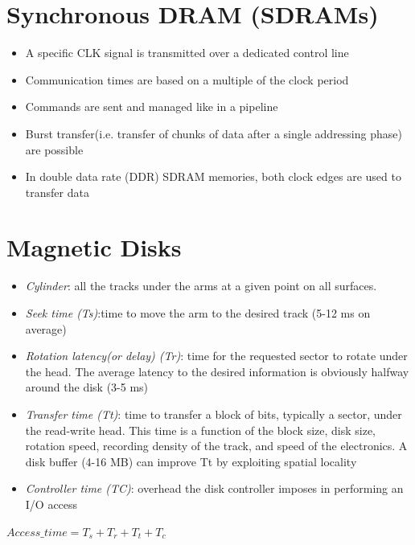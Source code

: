 \section{Synchronous DRAM (SDRAMs)}
\begin{itemize}
    \item A specific CLK signal is transmitted over a dedicated control line
    \item Communication times are based on a multiple of the clock period
    \item Commands are sent and managed like in a pipeline
    \item Burst transfer(i.e. transfer of chunks of data after a single addressing phase) are possible
    \item In double data rate (DDR) SDRAM memories, both clock edges are used to transfer data
\end{itemize}

\section{Magnetic Disks}
\begin{itemize}
    \item \textit{Cylinder}: all the tracks under the arms at a given point on all surfaces.
    \item \textit{Seek time (Ts)}:time to move the arm to the desired track (5-12 ms on average)
    \item \textit{Rotation latency(or delay) (Tr)}: time for the requested sector to rotate under the head. The average latency to the desired information is obviously halfway around the disk (3-5 ms)
    \item \textit{Transfer time (Tt)}: time to transfer a block of bits, typically a sector, under the read-write head. This time is a function of the block size, disk size, rotation speed, recording density of the track, and speed of the electronics. A disk buffer (4-16 MB) can improve Tt by exploiting spatial locality
    \item \textit{Controller time (TC)}: overhead the disk controller imposes in performing an I/O access 
\end{itemize}

$Access\_time = T_s + T_r + T_t + T_c$

